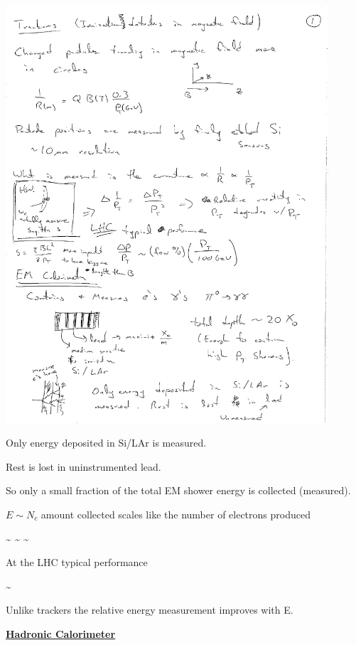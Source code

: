 {\begin{minipage}{0.3\textwidth}
\bc
\includegraphics[width=0.9\textwidth]{./SamplingCalo.pdf}
\ec
\end{minipage}\hfill
\begin{minipage}{0.7\textwidth}
Only energy deposited in Si/LAr  is measured. 

Rest is lost in uninstrumented lead.
\end{minipage}

So only a small fraction of the total EM shower energy is collected (measured).

$E \sim N_c$ amount collected scales like the number of electrons produced

\be
{} \sim {} \sim {} \sim {}
\ee

At the LHC typical performance

\be
{} \sim  {}
\ee

Unlike trackers the relative energy measurement improves with E.

\clearpage
\textbf{\underline{Hadronic Calorimeter}}

}
